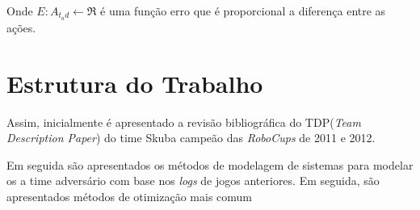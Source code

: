 Onde $E: A_{t_ad} \leftarrow \Re$ é uma função erro que é proporcional a diferença entre as ações.

\section{Estrutura do Trabalho}

\par Assim, inicialmente é apresentado a revisão bibliográfica do TDP(\textit{Team Description Paper}) do time Skuba
campeão das \textit{RoboCups} de 2011 e 2012. 
\par Em seguida são apresentados os métodos de modelagem de sistemas para modelar os
a time adversário com base nos \textit{logs} de jogos anteriores. Em seguida, são apresentados
métodos de otimização mais comum

